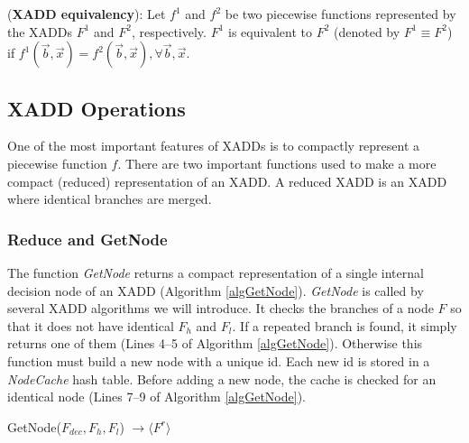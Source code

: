 \documentclass[twoside,11pt]{article}
\newenvironment{mydef}[1][Definition]{\begin{trivlist}
\item[\hskip \labelsep {\bfseries #1}]}{\end{trivlist}}
\begin{document}
\begin{mydef}(\textbf{XADD equivalency}): Let $f^1$ and $f^2$ be two piecewise functions represented by the XADDs $F^1$ and $F^2$, respectively. $F^1$ is equivalent to $F^2$ (denoted by $F^1 \equiv F^2$) if $f^1(\vec{b}, \vec{x}) = f^2(\vec{b}, \vec{x}), \forall \vec{b}, \vec{x}$.
\end{mydef}


\subsection{XADD Operations}
\label{sec:xaddoperations}

One of the most important features of XADDs is to compactly represent a piecewise function $f$. There are two important functions used to make a more compact (reduced) representation of an XADD. A reduced XADD is an XADD where identical branches are merged. 


\subsubsection{Reduce and GetNode}

The function \emph{GetNode} returns a compact representation of a single internal decision node of an XADD (Algorithm \ref{algGetNode}). \emph{GetNode} is called by several XADD algorithms we will introduce. It checks the branches of a node $F$ so that it does not have identical $F_h$ and $F_l$. If a repeated branch is found, it simply returns one of them (Lines 4--5 of Algorithm \ref{algGetNode}). Otherwise this function must build a new node with a unique id. Each new id is stored in a  \emph{NodeCache} hash table. Before adding a new node, the cache is checked for an identical node (Lines 7--9 of Algorithm \ref{algGetNode}). 

\incmargin{.5em}
\begin{algorithm}[t!]
\dontprintsemicolon
{}
\caption{{\sc GetNode}($F_{\mathit{dec}}, F_h, F_l$) $\longrightarrow \langle F^r \rangle$\label{algGetNode}}
\end{algorithm}
\decmargin{.5em}
\end{document}
